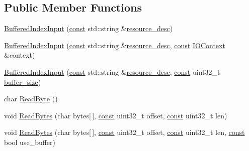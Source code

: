\subsection*{Public Member Functions}
\begin{DoxyCompactItemize}
\item 
\mbox{\hyperlink{classlucene_1_1core_1_1store_1_1BufferedIndexInput_a017ac4b59db1a4b76692a730a46a6530}{Buffered\+Index\+Input}} (\mbox{\hyperlink{ZlibCrc32_8h_a2c212835823e3c54a8ab6d95c652660e}{const}} std\+::string \&\mbox{\hyperlink{classlucene_1_1core_1_1store_1_1IndexInput_a5425147277f9cf9c08ba50e411c45473}{resource\+\_\+desc}})
\item 
\mbox{\hyperlink{classlucene_1_1core_1_1store_1_1BufferedIndexInput_ae480856ca86e73576266602d842c1391}{Buffered\+Index\+Input}} (\mbox{\hyperlink{ZlibCrc32_8h_a2c212835823e3c54a8ab6d95c652660e}{const}} std\+::string \&\mbox{\hyperlink{classlucene_1_1core_1_1store_1_1IndexInput_a5425147277f9cf9c08ba50e411c45473}{resource\+\_\+desc}}, \mbox{\hyperlink{ZlibCrc32_8h_a2c212835823e3c54a8ab6d95c652660e}{const}} \mbox{\hyperlink{classlucene_1_1core_1_1store_1_1IOContext}{I\+O\+Context}} \&context)
\item 
\mbox{\hyperlink{classlucene_1_1core_1_1store_1_1BufferedIndexInput_a5c7bfec7bc319906f9ba40407818606d}{Buffered\+Index\+Input}} (\mbox{\hyperlink{ZlibCrc32_8h_a2c212835823e3c54a8ab6d95c652660e}{const}} std\+::string \&\mbox{\hyperlink{classlucene_1_1core_1_1store_1_1IndexInput_a5425147277f9cf9c08ba50e411c45473}{resource\+\_\+desc}}, \mbox{\hyperlink{ZlibCrc32_8h_a2c212835823e3c54a8ab6d95c652660e}{const}} uint32\+\_\+t \mbox{\hyperlink{classlucene_1_1core_1_1store_1_1BufferedIndexInput_a93fdee4afc7f7efba930969747112f8a}{buffer\+\_\+size}})
\item 
char \mbox{\hyperlink{classlucene_1_1core_1_1store_1_1BufferedIndexInput_a6e3f97c5f13987f4e8cf31dfe4b31060}{Read\+Byte}} ()
\item 
void \mbox{\hyperlink{classlucene_1_1core_1_1store_1_1BufferedIndexInput_ac762d844af38d0b8835f66af3ba46c4c}{Read\+Bytes}} (char bytes\mbox{[}$\,$\mbox{]}, \mbox{\hyperlink{ZlibCrc32_8h_a2c212835823e3c54a8ab6d95c652660e}{const}} uint32\+\_\+t offset, \mbox{\hyperlink{ZlibCrc32_8h_a2c212835823e3c54a8ab6d95c652660e}{const}} uint32\+\_\+t len)
\item 
void \mbox{\hyperlink{classlucene_1_1core_1_1store_1_1BufferedIndexInput_a7f2044785a89abeba70777d0489f8d4f}{Read\+Bytes}} (char bytes\mbox{[}$\,$\mbox{]}, \mbox{\hyperlink{ZlibCrc32_8h_a2c212835823e3c54a8ab6d95c652660e}{const}} uint32\+\_\+t offset, \mbox{\hyperlink{ZlibCrc32_8h_a2c212835823e3c54a8ab6d95c652660e}{const}} uint32\+\_\+t len, \mbox{\hyperlink{ZlibCrc32_8h_a2c212835823e3c54a8ab6d95c652660e}{const}} bool use\+\_\+buffer)

\end{DoxyCompactItemize}
